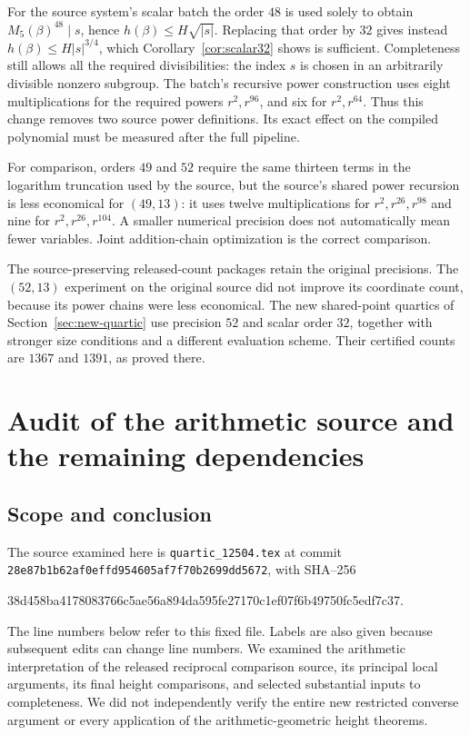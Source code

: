\documentclass[11pt]{article}
\theoremstyle{definition}
\begin{document}
For the source system's scalar batch the order $48$ is used solely to
obtain $M_5(\beta)^{48}\mid s$, hence
$h(\beta)\le H\sqrt{|s|}$. Replacing that order by $32$ gives instead
$h(\beta)\le H|s|^{3/4}$, which Corollary~\ref{cor:scalar32} shows
is sufficient. Completeness still allows all the required divisibilities:
the index $s$ is chosen in an arbitrarily divisible nonzero subgroup.
The batch's recursive power construction uses eight multiplications
for the required powers $r^2,r^{96}$, and six for $r^2,r^{64}$.
Thus this change removes two source power definitions. Its exact effect
on the compiled polynomial must be measured after the full pipeline.

For comparison, orders $49$ and $52$ require the same thirteen terms
in the logarithm truncation used by the source, but the source's shared
power recursion is less economical for $(49,13)$: it uses twelve
multiplications for $r^2,r^{26},r^{98}$ and nine for
$r^2,r^{26},r^{104}$. A smaller numerical precision does not automatically
mean fewer variables. Joint addition-chain optimization is the correct
comparison.


The source-preserving released-count packages retain the original precisions.
The $(52,13)$ experiment on the original source did not improve its
coordinate count, because its power chains were less economical.
The new shared-point quartics of Section~\ref{sec:new-quartic}
use precision $52$ and scalar order $32$, together with stronger
size conditions and a different evaluation scheme. Their certified
counts are $1367$ and $1391$, as proved there.


\section{Audit of the arithmetic source and the remaining dependencies}
\label{sec:arithmetic-source-audit}

\subsection{Scope and conclusion}

The source examined here is \texttt{quartic\_12504.tex} at commit
\nolinkurl{28e87b1b62af0effd954605af7f70b2699dd5672}, with SHA--256
\begin{center}\footnotesize\ttfamily
38d458ba4178083766c5ae56a894da595fe27170c1ef07f6b49750fc5edf7c37.
\end{center}
The line numbers below refer to this fixed file.  Labels are also given
because subsequent edits can change line numbers.  We examined the
arithmetic interpretation of the released reciprocal comparison source,
its principal local arguments, its final height comparisons, and selected
substantial inputs to completeness.  We did not independently verify the
entire new restricted converse argument or every application of the
arithmetic-geometric height theorems.
\end{document}
